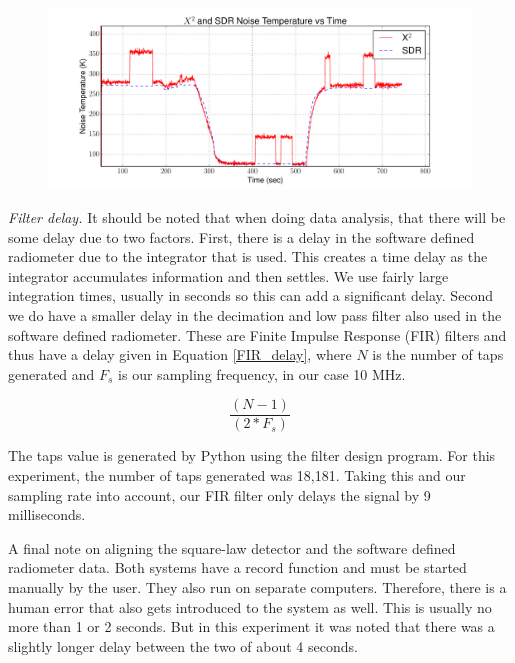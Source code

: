\begin{figure}[h!tb] \centering
\includegraphics[width=\textwidth]{Experiments/Exp4/calib_filtered_both.pdf}
\label{filter_on}
\end{figure}

\emph{Filter delay.}  It should be noted that when doing data analysis, that there will be some delay due to two factors.  First, there is a delay in the software defined radiometer due to the integrator that is used.  This creates a time delay as the integrator accumulates information and then settles.  We use fairly large integration times, usually in seconds so this can add a significant delay.  Second we do have a smaller delay in the decimation and low pass filter also used in the software defined radiometer.  These are Finite Impulse Response (FIR) filters and thus have a delay given in Equation \ref{FIR_delay}, where $N$ is the number of taps generated and $F_{s}$ is our sampling frequency, in our case 10 MHz.

\begin{equation}\label{FIR_delay}
\frac{(N - 1)}{(2*F_{s})}
\end{equation}

The taps value is generated by Python using the filter design program.  For this experiment, the number of taps generated was 18,181.  Taking this and our sampling rate into account, our FIR filter only delays the signal by 9 milliseconds.  

A final note on aligning the square-law detector and the software defined radiometer data.  Both systems have a record function and must be started manually by the user.  They also run on separate computers.  Therefore, there is a human error that also gets introduced to the system as well.  This is usually no more than 1 or 2 seconds.  But in this experiment it was noted that there was a slightly longer delay between the two of about 4 seconds.  

